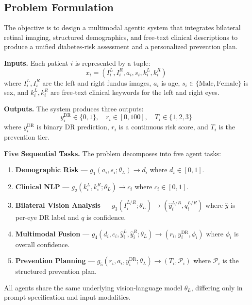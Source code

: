 \documentclass[11pt,a4paper]{article}
\begin{document}
\subsection{Problem Formulation}

The objective is to design a multimodal agentic system that integrates bilateral retinal imaging, structured demographics, and free-text clinical descriptions to produce a unified diabetes-risk assessment and a personalized prevention plan.

\textbf{Inputs.} Each patient $i$ is represented by a tuple:
\begin{equation}
x_i = (I_i^L, I_i^R, a_i, s_i, k_i^L, k_i^R)
\end{equation}
where $I_i^L, I_i^R$ are the left and right fundus images, $a_i$ is age, $s_i \in \{\text{Male}, \text{Female}\}$ is sex, and $k_i^L, k_i^R$ are free-text clinical keywords for the left and right eyes.

\textbf{Outputs.} The system produces three outputs:
\begin{equation}
y_i^{\text{DR}} \in \{0, 1\}, \quad r_i \in [0, 100], \quad T_i \in \{1, 2, 3\}
\end{equation}
where $y_i^{\text{DR}}$ is binary DR prediction, $r_i$ is a continuous risk score, and $T_i$ is the prevention tier.

\textbf{Five Sequential Tasks.} The problem decomposes into five agent tasks:

\begin{enumerate}
    \item \textbf{Demographic Risk} --- $g_1(a_i, s_i; \theta_L) \rightarrow d_i$ where $d_i \in [0, 1]$.
    \item \textbf{Clinical NLP} --- $g_2(k_i^L, k_i^R; \theta_L) \rightarrow c_i$ where $c_i \in [0, 1]$.
    \item \textbf{Bilateral Vision Analysis} --- $g_{3}(I_i^{L/R}; \theta_L) \rightarrow (\hat{y}_i^{L/R}, q_i^{L/R})$ where $\hat{y}$ is per-eye DR label and $q$ is confidence.
    \item \textbf{Multimodal Fusion} --- $g_4(d_i, c_i, \hat{y}_i^L, \hat{y}_i^R; \theta_L) \rightarrow (r_i, y_i^{\text{DR}}, \phi_i)$ where $\phi_i$ is overall confidence.
    \item \textbf{Prevention Planning} --- $g_5(r_i, a_i, y_i^{\text{DR}}; \theta_L) \rightarrow (T_i, \mathcal{P}_i)$ where $\mathcal{P}_i$ is the structured prevention plan.
\end{enumerate}

All agents share the same underlying vision-language model $\theta_L$, differing only in prompt specification and input modalities.
\end{document}
